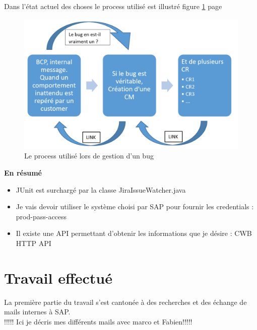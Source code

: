 Dans l'état actuel des choses le process utilisé est illustré figure \ref{figure:bugManagementProcess} page \pageref{figure:bugManagementProcess}

\begin{figure}[!h]
  \centering
      \includegraphics[width=\textwidth]{images/bugManagementProcess.png}
  \caption{Le process utilisé lors de gestion d'un bug}
	\label{figure:bugManagementProcess}
\end{figure}





\textbf{En résumé}\hfill \\ \indent 
\begin{itemize}
	\item JUnit est surchargé par la classe JiraIssueWatcher.java
	\item Je vais devoir utiliser le système choisi par SAP pour fournir les credentials : \Large{prod-pass-access}\normalsize
	\item Il existe une API permettant d'obtenir les informations que je désire : \Large{CWB HTTP API}\normalsize
\end{itemize}




\section{Travail effectué}


La première partie du travail s'est cantonée à des recherches et des échange de mails internes à SAP.\\

!!!!!  Ici je décris mes différents mails avec marco et Fabien!!!!!\\


